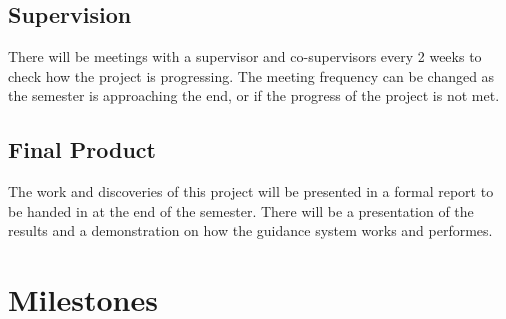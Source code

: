 \documentclass[a4paper,10pt]{article}
\begin{document}
	
	\subsection{Supervision}
	There will be meetings with a supervisor and co-supervisors every 2 weeks to check how the project is progressing. The meeting frequency can be changed as the semester is approaching the end, or if the progress of the project is not met.
	
	\subsection{Final Product}
	The work and discoveries of this project will be presented in a formal report to be handed in at the end of the semester. There will be a presentation of the results and a demonstration on how the guidance system works and performes.

\section{Milestones}
\end{document}
